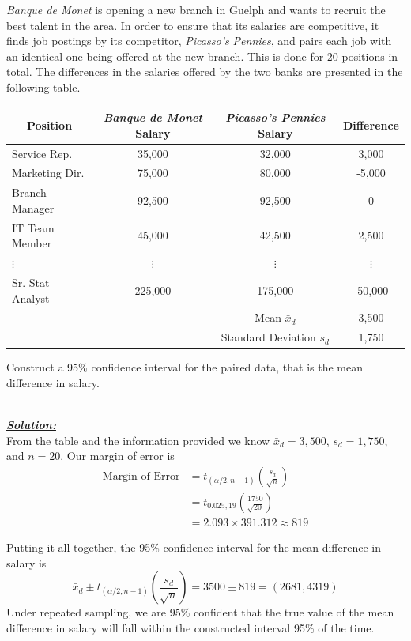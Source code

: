 \begin{example}
\textit{Banque de Monet} is opening a new branch in Guelph and wants to recruit the best talent in the area. In order to ensure that its salaries are competitive, it finds job postings by its competitor, \textit{Picasso's Pennies}, and pairs each job with an identical one being offered at the new branch. This is done for 20 positions in total. The differences in the salaries offered by the two banks are presented in the following table.
\begin{center}
\begin{tabular}{l |c|c|c}

\multicolumn{1}{c|}{Position} & \textit{Banque de Monet} Salary & \textit{Picasso's Pennies} Salary & Difference \\ 
\hline %
Service Rep. & 35,000 & 32,000 & 3,000 \\ 
\hline 
Marketing Dir. & 75,000 & 80,000 & -5,000 \\ 
\hline 
Branch Manager & 92,500 & 92,500 & 0 \\ 
\hline 
IT Team Member & 45,000 & 42,500 & 2,500 \\ 
\hline 
$\vdots$ & $\vdots$ & $\vdots$ & $\vdots$ \\ 
\hline 
Sr. Stat Analyst & 225,000 & 175,000 & -50,000 \\ 
\hline %
\multicolumn{2}{c}{} & Mean $\bar{x}_d$ & 3,500 \\ 
\multicolumn{2}{c}{} & Standard Deviation $s_d$ & 1,750 \\
\end{tabular} 
\end{center}

Construct a 95\% confidence interval for the paired data, that is the mean difference in salary.


\hfill\\
{\emph{\textbf{\underline{Solution:}}}}\\


From the table and the information provided we know $\bar{x}_d=3,500$, $s_d = 1,750$, and $n=20$. Our margin of error is
\begin{align*}
\text{Margin of Error} &= t_{(\alpha/2,n-1)} \left( \frac{s_d}{\sqrt{n}}\right) \\
&= t_{0.025, 19} \left( \frac{1750}{\sqrt{20}} \right) \\
&= 2.093 \times 391.312 \approx 819
\end{align*}

Putting it all together, the 95\% confidence interval for the mean difference in salary is 
\[ \bar{x}_d \pm t_{(\alpha/2,n-1)} \left( \frac{s_d}{\sqrt{n}} \right) = 3500 \pm 819 = (2681,4319)\]
Under repeated sampling, we are 95\% confident that the true value of the mean difference in salary will fall within the constructed interval 95\% of the time. 
\end{example}









